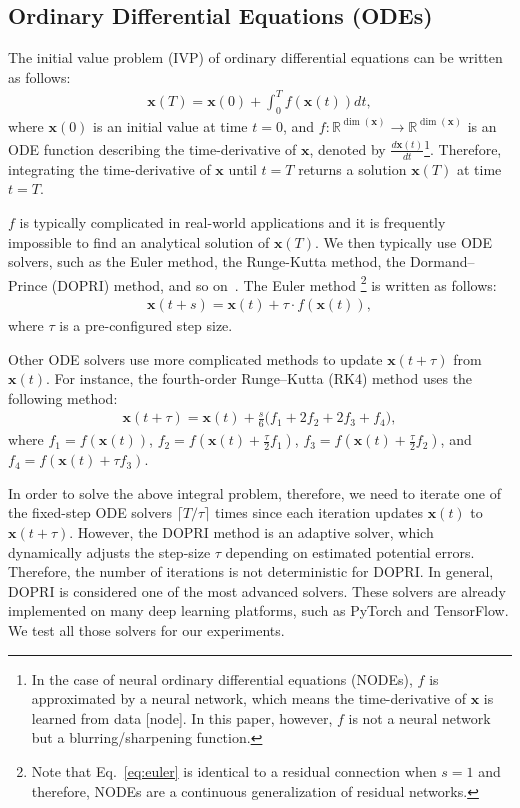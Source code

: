 \documentclass[sigconf,natbib=true]{acmart}
\begin{document}
\subsection{Ordinary Differential Equations (ODEs)}\label{sec:solver}
The initial value problem (IVP) of ordinary differential equations can be written as follows:
\begin{align}
    \bm{x}(T) = \bm{x}(0) + \int_0^T f(\bm{x}(t)) dt,
\end{align}where $\bm{x}(0)$ is an initial value at time $t=0$, and $f:\mathbb{R}^{\dim(\bm{x})} \rightarrow \mathbb{R}^{\dim(\bm{x})}$ is an ODE function describing the time-derivative of $\bm{x}$, denoted by $\frac{d\bm{x}(t)}{dt}$\footnote{In the case of neural ordinary differential equations (NODEs), $f$ is approximated by a neural network, which means the time-derivative of $\bm{x}$ is learned from data [node]. In this paper, however, $f$ is not a neural network but a blurring/sharpening function.}. Therefore, integrating the time-derivative of $\bm{x}$ until $t=T$ returns a solution $\bm{x}(T)$ at time $t=T$.

$f$ is typically complicated in real-world applications and it is frequently impossible to find an analytical solution of $\bm{x}(T)$. We then typically use ODE solvers, such as the Euler method, the Runge-Kutta method, the Dormand--Prince (DOPRI) method, and so on~\cite{dormand1980dopri}. The Euler method \footnote{Note that Eq.~\eqref{eq:euler} is identical to a residual connection when $s=1$ and therefore, NODEs are a continuous generalization of residual networks.} is written as follows:
\begin{align}\label{eq:euler}
\bm{x}(t + s) = \bm{x}(t) + \tau \cdot f(\bm{x}(t)),
\end{align}where $\tau$ is a pre-configured step size.


Other ODE solvers use more complicated methods to update $\bm{x}(t + \tau)$ from $\bm{x}(t)$. For instance, the fourth-order Runge--Kutta (RK4) method uses the following method:
\begin{align}\label{eq:rk4}
\bm{x}(t + \tau) = \bm{x}(t) + \frac{s}{6}\Big(f_1 + 2f_2 + 2f_3 + f_4\Big),
\end{align}where $f_1 = f(\bm{x}(t))$, $f_2 = f(\bm{x}(t) + \frac{\tau}{2}f_1)$, $f_3 = f(\bm{x}(t) + \frac{\tau}{2}f_2)$, and $f_4 = f(\bm{x}(t)+\tau f_3)$.

In order to solve the above integral problem, therefore, we need to iterate one of the fixed-step ODE solvers $\lceil T/\tau \rceil$ times since each iteration updates $\bm{x}(t)$ to $\bm{x}(t+\tau)$. However, the DOPRI method is an adaptive solver, which dynamically adjusts the step-size $\tau$ depending on estimated potential errors. Therefore, the number of iterations is not deterministic for DOPRI. In general, DOPRI is considered one of the most advanced solvers. 
These solvers are already implemented on many deep learning platforms, such as PyTorch and TensorFlow. We test all those solvers for our experiments.
\end{document}
